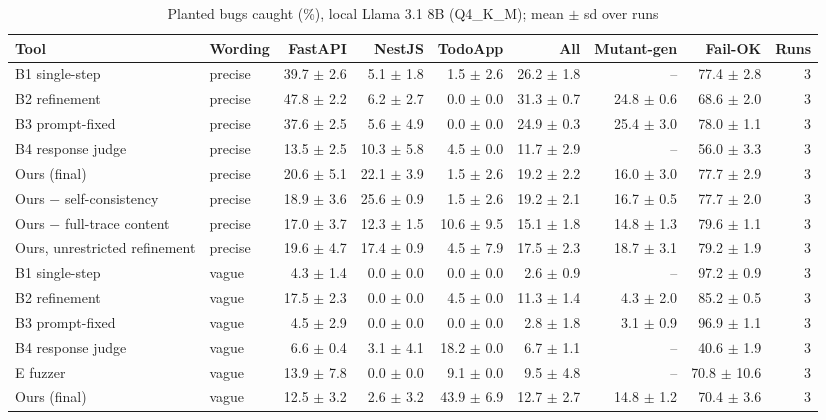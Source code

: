 \begin{table}[t]\centering\small
\caption{Planted bugs caught (\%), local Llama 3.1 8B (Q4\_K\_M); mean $\pm$ sd over runs}
\begin{tabular}{llrrrrrrr}
\toprule
Tool & Wording & FastAPI & NestJS & TodoApp & All & Mutant-gen & Fail-OK & Runs \\
\midrule
B1 single-step & precise & 39.7 $\pm$ 2.6 & 5.1 $\pm$ 1.8 & 1.5 $\pm$ 2.6 & 26.2 $\pm$ 1.8 & – & 77.4 $\pm$ 2.8 & 3 \\
B2 refinement & precise & 47.8 $\pm$ 2.2 & 6.2 $\pm$ 2.7 & 0.0 $\pm$ 0.0 & 31.3 $\pm$ 0.7 & 24.8 $\pm$ 0.6 & 68.6 $\pm$ 2.0 & 3 \\
B3 prompt-fixed & precise & 37.6 $\pm$ 2.5 & 5.6 $\pm$ 4.9 & 0.0 $\pm$ 0.0 & 24.9 $\pm$ 0.3 & 25.4 $\pm$ 3.0 & 78.0 $\pm$ 1.1 & 3 \\
B4 response judge & precise & 13.5 $\pm$ 2.5 & 10.3 $\pm$ 5.8 & 4.5 $\pm$ 0.0 & 11.7 $\pm$ 2.9 & – & 56.0 $\pm$ 3.3 & 3 \\
Ours (final) & precise & 20.6 $\pm$ 5.1 & 22.1 $\pm$ 3.9 & 1.5 $\pm$ 2.6 & 19.2 $\pm$ 2.2 & 16.0 $\pm$ 3.0 & 77.7 $\pm$ 2.9 & 3 \\
Ours − self-consistency & precise & 18.9 $\pm$ 3.6 & 25.6 $\pm$ 0.9 & 1.5 $\pm$ 2.6 & 19.2 $\pm$ 2.1 & 16.7 $\pm$ 0.5 & 77.7 $\pm$ 2.0 & 3 \\
Ours − full-trace content & precise & 17.0 $\pm$ 3.7 & 12.3 $\pm$ 1.5 & 10.6 $\pm$ 9.5 & 15.1 $\pm$ 1.8 & 14.8 $\pm$ 1.3 & 79.6 $\pm$ 1.1 & 3 \\
Ours, unrestricted refinement & precise & 19.6 $\pm$ 4.7 & 17.4 $\pm$ 0.9 & 4.5 $\pm$ 7.9 & 17.5 $\pm$ 2.3 & 18.7 $\pm$ 3.1 & 79.2 $\pm$ 1.9 & 3 \\
B1 single-step & vague & 4.3 $\pm$ 1.4 & 0.0 $\pm$ 0.0 & 0.0 $\pm$ 0.0 & 2.6 $\pm$ 0.9 & – & 97.2 $\pm$ 0.9 & 3 \\
B2 refinement & vague & 17.5 $\pm$ 2.3 & 0.0 $\pm$ 0.0 & 4.5 $\pm$ 0.0 & 11.3 $\pm$ 1.4 & 4.3 $\pm$ 2.0 & 85.2 $\pm$ 0.5 & 3 \\
B3 prompt-fixed & vague & 4.5 $\pm$ 2.9 & 0.0 $\pm$ 0.0 & 0.0 $\pm$ 0.0 & 2.8 $\pm$ 1.8 & 3.1 $\pm$ 0.9 & 96.9 $\pm$ 1.1 & 3 \\
B4 response judge & vague & 6.6 $\pm$ 0.4 & 3.1 $\pm$ 4.1 & 18.2 $\pm$ 0.0 & 6.7 $\pm$ 1.1 & – & 40.6 $\pm$ 1.9 & 3 \\
E fuzzer & vague & 13.9 $\pm$ 7.8 & 0.0 $\pm$ 0.0 & 9.1 $\pm$ 0.0 & 9.5 $\pm$ 4.8 & – & 70.8 $\pm$ 10.6 & 3 \\
Ours (final) & vague & 12.5 $\pm$ 3.2 & 2.6 $\pm$ 3.2 & 43.9 $\pm$ 6.9 & 12.7 $\pm$ 2.7 & 14.8 $\pm$ 1.2 & 70.4 $\pm$ 3.6 & 3 \\

\end{tabular}
\end{table}
